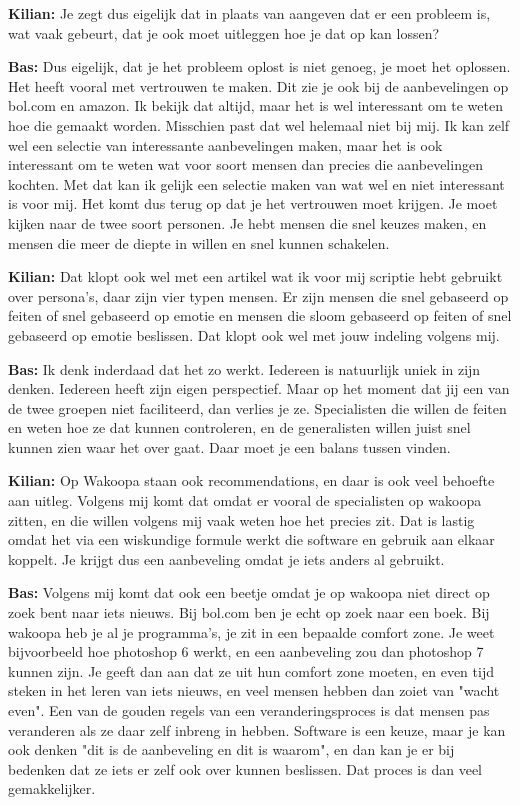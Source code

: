 \textbf{Kilian:} Je zegt dus eigelijk dat in plaats van aangeven dat er een probleem is, wat vaak gebeurt, dat je ook moet uitleggen hoe je dat op kan lossen?

\textbf{Bas:} Dus eigelijk, dat je het probleem oplost is niet genoeg, je moet het oplossen. Het heeft vooral met vertrouwen te maken. Dit zie je ook bij de aanbevelingen op bol.com en amazon. Ik bekijk dat altijd, maar het is wel interessant om te weten hoe die gemaakt worden. Misschien past dat wel helemaal niet bij mij. Ik kan zelf wel een selectie van interessante aanbevelingen maken, maar het is ook interessant om te weten wat voor soort mensen dan precies die aanbevelingen kochten. Met dat kan ik gelijk een selectie maken van wat wel en niet interessant is voor mij. Het komt dus terug op dat je het vertrouwen moet krijgen. Je moet kijken naar de twee soort personen. Je hebt mensen die snel keuzes maken, en mensen die meer de diepte in willen en snel kunnen schakelen.

\textbf{Kilian:} Dat klopt ook wel met een artikel wat ik voor mij scriptie hebt gebruikt over persona's, daar zijn vier typen mensen. Er zijn mensen die snel gebaseerd op feiten of snel gebaseerd op emotie en mensen die sloom gebaseerd op feiten of snel gebaseerd op emotie beslissen. Dat klopt ook wel met jouw indeling volgens mij.

\textbf{Bas:} Ik denk inderdaad dat het zo werkt. Iedereen is natuurlijk uniek in zijn denken. Iedereen heeft zijn eigen perspectief. Maar op het moment dat jij een van de twee groepen niet faciliteerd, dan verlies je ze. Specialisten die willen de feiten en weten hoe ze dat kunnen controleren, en de generalisten willen juist snel kunnen zien waar het over gaat. Daar moet je een balans tussen vinden.

\textbf{Kilian:} Op Wakoopa staan ook recommendations, en daar is ook veel behoefte aan uitleg. Volgens mij komt dat omdat er vooral de specialisten op wakoopa zitten, en die willen volgens mij vaak weten hoe het precies zit. Dat is lastig omdat het via een wiskundige formule werkt die software en gebruik aan elkaar koppelt. Je krijgt dus een aanbeveling omdat je iets anders al gebruikt.

\textbf{Bas:} Volgens mij komt dat ook een beetje omdat je op wakoopa niet direct op zoek bent naar iets nieuws. Bij bol.com ben je echt op zoek naar een boek. Bij wakoopa heb je al je programma's, je zit in een bepaalde comfort zone. Je weet bijvoorbeeld hoe photoshop 6 werkt, en een aanbeveling zou dan photoshop 7 kunnen zijn. Je geeft dan aan dat ze uit hun comfort zone moeten, en even tijd steken in het leren van iets nieuws, en veel mensen hebben dan zoiet van "wacht even". Een van de gouden regels van een veranderingsproces is dat mensen pas veranderen als ze daar zelf inbreng in hebben. Software is een keuze, maar je kan ook denken "dit is de aanbeveling en dit is waarom", en dan kan je er bij bedenken dat ze iets er zelf ook over kunnen beslissen. Dat proces is dan veel gemakkelijker.

